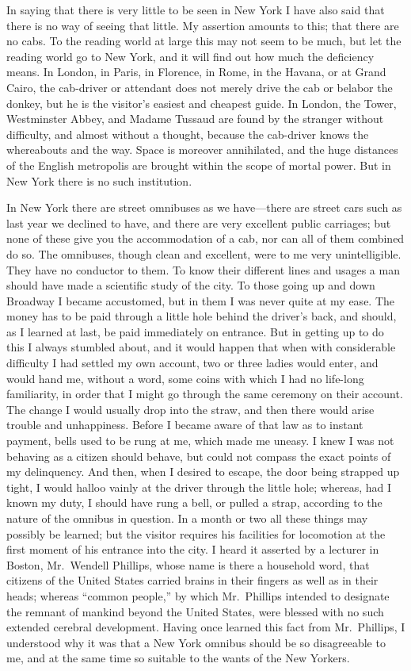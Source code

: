 In saying that there is very little to be seen in New York I have
also said that there is no way of seeing that little.  My assertion
amounts to this; that there are no cabs.  To the reading world at
large this may not seem to be much, but let the reading world go to
New York, and it will find out how much the deficiency means.  In
London, in Paris, in Florence, in Rome, in the Havana, or at Grand
Cairo, the cab-driver or attendant does not merely drive the cab or
belabor the donkey, but he is the visitor's easiest and cheapest
guide.  In London, the Tower, Westminster Abbey, and Madame Tussaud
are found by the stranger without difficulty, and almost without a
thought, because the cab-driver knows the whereabouts and the way.
Space is moreover annihilated, and the huge distances of the
English metropolis are brought within the scope of mortal power.
But in New York there is no such institution.

In New York there are street omnibuses as we have---there are street
cars such as last year we declined to have, and there are very
excellent public carriages; but none of these give you the
accommodation of a cab, nor can all of them combined do so.  The
omnibuses, though clean and excellent, were to me very
unintelligible.  They have no conductor to them.  To know their
different lines and usages a man should have made a scientific
study of the city.  To those going up and down Broadway I became
accustomed, but in them I was never quite at my ease.  The money
has to be paid through a little hole behind the driver's back, and
should, as I learned at last, be paid immediately on entrance.  But
in getting up to do this I always stumbled about, and it would
happen that when with considerable difficulty I had settled my own
account, two or three ladies would enter, and would hand me,
without a word, some coins with which I had no life-long
familiarity, in order that I might go through the same ceremony on
their account.  The change I would usually drop into the straw, and
then there would arise trouble and unhappiness.  Before I became
aware of that law as to instant payment, bells used to be rung at
me, which made me uneasy.  I knew I was not behaving as a citizen
should behave, but could not compass the exact points of my
delinquency.  And then, when I desired to escape, the door being
strapped up tight, I would halloo vainly at the driver through the
little hole; whereas, had I known my duty, I should have rung a
bell, or pulled a strap, according to the nature of the omnibus in
question.  In a month or two all these things may possibly be
learned; but the visitor requires his facilities for locomotion at
the first moment of his entrance into the city.  I heard it
asserted by a lecturer in Boston, Mr.\ Wendell Phillips, whose name
is there a household word, that citizens of the United States
carried brains in their fingers as well as in their heads; whereas
``common people,'' by which Mr.\ Phillips intended to designate the
remnant of mankind beyond the United States, were blessed with no
such extended cerebral development.  Having once learned this fact
from Mr.\ Phillips, I understood why it was that a New York omnibus
should be so disagreeable to me, and at the same time so suitable
to the wants of the New Yorkers.

